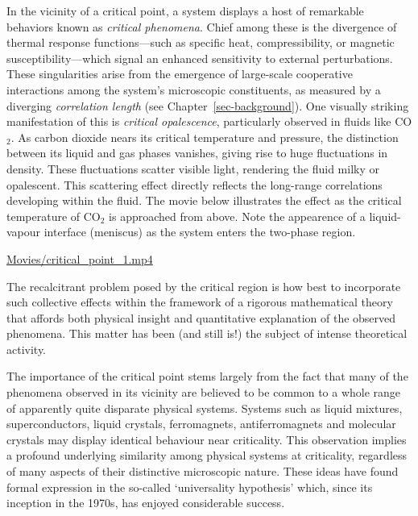 \documentclass[
  letterpaper,
  enabledeprecatedfontcommands]{report}
\begin{document}
In the vicinity of a critical point, a system displays a host of
remarkable behaviors known as \emph{critical phenomena}. Chief among
these is the divergence of thermal response functions---such as specific
heat, compressibility, or magnetic susceptibility---which signal an
enhanced sensitivity to external perturbations. These singularities
arise from the emergence of large-scale cooperative interactions among
the system's microscopic constituents, as measured by a diverging
\emph{correlation length} (see Chapter~\ref{sec-background}). One
visually striking manifestation of this is \emph{critical opalescence},
particularly observed in fluids like CO\(_2\). As carbon dioxide nears
its critical temperature and pressure, the distinction between its
liquid and gas phases vanishes, giving rise to huge fluctuations in
density. These fluctuations scatter visible light, rendering the fluid
milky or opalescent. This scattering effect directly reflects the
long-range correlations developing within the fluid. The movie below
illustrates the effect as the critical temperature of CO\(_2\) is
approached from above. Note the appearence of a liquid-vapour interface
(meniscus) as the system enters the two-phase region.

\url{Movies/critical_point_1.mp4}

The recalcitrant problem posed by the critical region is how best to
incorporate such collective effects within the framework of a rigorous
mathematical theory that affords both physical insight and quantitative
explanation of the observed phenomena. This matter has been (and still
is!) the subject of intense theoretical activity.

The importance of the critical point stems largely from the fact that
many of the phenomena observed in its vicinity are believed to be common
to a whole range of apparently quite disparate physical systems. Systems
such as liquid mixtures, superconductors, liquid crystals, ferromagnets,
antiferromagnets and molecular crystals may display identical behaviour
near criticality. This observation implies a profound underlying
similarity among physical systems at criticality, regardless of many
aspects of their distinctive microscopic nature. These ideas have found
formal expression in the so-called `universality hypothesis' which,
since its inception in the 1970s, has enjoyed considerable success.
\end{document}
